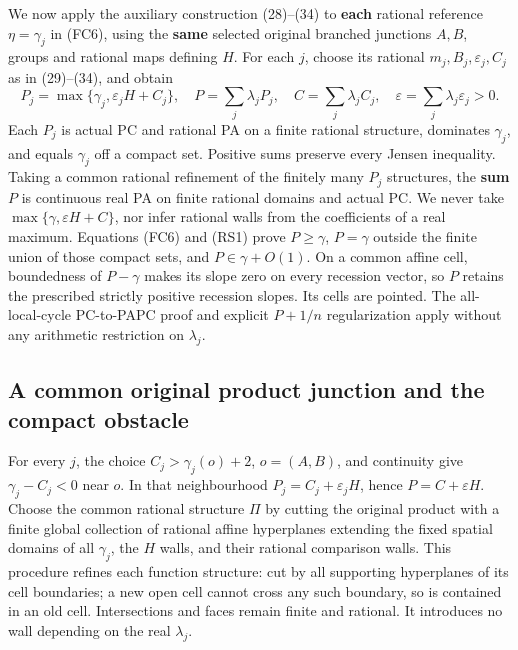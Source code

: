 \documentclass[
  11pt,
]{article}
\begin{document}
We now apply the auxiliary construction (28)--(34) to \textbf{each}
rational reference \(\eta=\gamma_j\) in (FC6), using the \textbf{same}
selected original branched junctions \(A,B\), groups and rational maps
defining \(H\). For each \(j\), choose its rational
\(m_j,B_j,\varepsilon_j,C_j\) as in (29)--(34), and obtain \[
 P_j=\max\{\gamma_j,\varepsilon_j H+C_j\},\quad
 P=\sum_j\lambda_jP_j,\quad
 C=\sum_j\lambda_jC_j,\quad
 \varepsilon=\sum_j\lambda_j\varepsilon_j>0.                \tag{RS1}
\] Each \(P_j\) is actual PC and rational PA on a finite rational
structure, dominates \(\gamma_j\), and equals \(\gamma_j\) off a compact
set. Positive sums preserve every Jensen inequality. Taking a common
rational refinement of the finitely many \(P_j\) structures, the
\textbf{sum} \(P\) is continuous real PA on finite rational domains and
actual PC. We never take \(\max\{\gamma,\varepsilon H+C\}\), nor infer
rational walls from the coefficients of a real maximum. Equations (FC6)
and (RS1) prove \(P\geq\gamma\), \(P=\gamma\) outside the finite union
of those compact sets, and \(P\in\gamma+O(1)\). On a common affine cell,
boundedness of \(P-\gamma\) makes its slope zero on every recession
vector, so \(P\) retains the prescribed strictly positive recession
slopes. Its cells are pointed. The all-local-cycle PC-to-PAPC proof and
explicit \(P+1/n\) regularization apply without any arithmetic
restriction on \(\lambda_j\).

\subsection{A common original product junction and the compact
obstacle}\label{a-common-original-product-junction-and-the-compact-obstacle}

For every \(j\), the choice \(C_j>\gamma_j(o)+2\), \(o=(A,B)\), and
continuity give \(\gamma_j-C_j<0\) near \(o\). In that neighbourhood
\(P_j=C_j+\varepsilon_jH\), hence \(P=C+\varepsilon H\). Choose the
common rational structure \(\Pi\) by cutting the original product with a
finite global collection of rational affine hyperplanes extending the
fixed spatial domains of all \(\gamma_j\), the \(H\) walls, and their
rational comparison walls. This procedure refines each function
structure: cut by all supporting hyperplanes of its cell boundaries; a
new open cell cannot cross any such boundary, so is contained in an old
cell. Intersections and faces remain finite and rational. It introduces
no wall depending on the real \(\lambda_j\).
\end{document}
